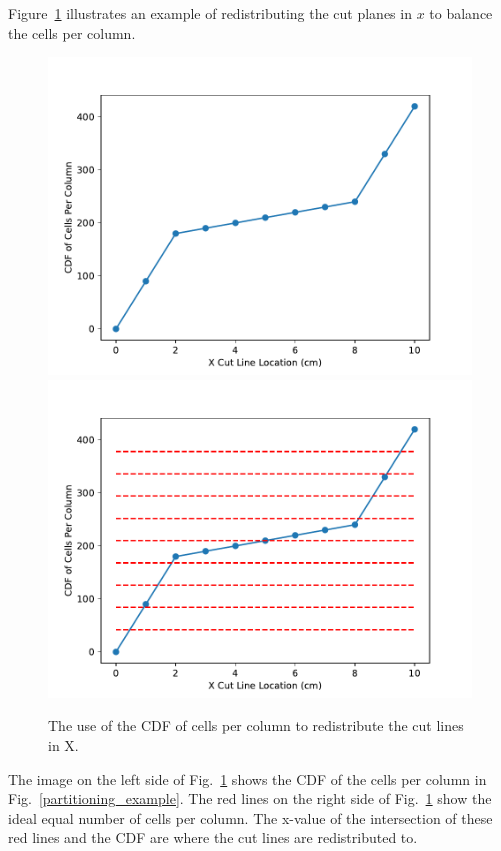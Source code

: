 \documentclass[times,final]{elsarticle}
\begin{document}
Figure~\ref{redistribute} illustrates an example of redistributing the cut planes in $x$ to balance the cells per column.
\begin{figure}[H]
\centering
\includegraphics[scale=0.4]{../figures/spiderweb_redistribute_before_sparse.pdf}
\includegraphics[scale=0.4]{../figures/spiderweb_redistribute_after_sparse.pdf}
\caption{The use of the CDF of cells per column to redistribute the cut lines in X.}
\label{redistribute}
\end{figure}
The image on the left side of Fig.~\ref{redistribute} shows the CDF of the cells per column in Fig.~\ref{partitioning_example}. The red lines on the right side of Fig.~\ref{redistribute} show the ideal equal number of cells per column. The x-value of the intersection of these red lines and the CDF are where the cut lines are redistributed to.
\end{document}
